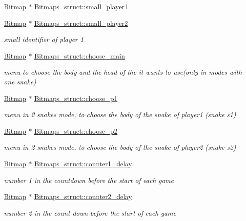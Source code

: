 \begin{DoxyCompactItemize}
\hyperlink{structBitmap}{Bitmap} $\ast$ \hyperlink{group__graphics_ga500b120fd59215d5436fe2121557d34a}{Bitmaps\+\_\+struct\+::small\+\_\+player1}
\item 
\hyperlink{structBitmap}{Bitmap} $\ast$ \hyperlink{group__graphics_ga6d0717c0730d1f4bf907299c4cb3fb97}{Bitmaps\+\_\+struct\+::small\+\_\+player2}
\begin{DoxyCompactList}\small\item\em small identifier of player 1 \end{DoxyCompactList}\item 
\hyperlink{structBitmap}{Bitmap} $\ast$ \hyperlink{group__graphics_ga0fe961b9b328a12b933b0e3d2393e9d4}{Bitmaps\+\_\+struct\+::choose\+\_\+main}
\begin{DoxyCompactList}\small\item\em menu to choose the body and the head of the it wants to use(only in modes with one snake) \end{DoxyCompactList}\item 
\hyperlink{structBitmap}{Bitmap} $\ast$ \hyperlink{group__graphics_ga1c051bf49f7de6f60eb93649684ebfb5}{Bitmaps\+\_\+struct\+::choose\+\_\+p1}
\begin{DoxyCompactList}\small\item\em menu in 2 snakes mode, to choose the body of the snake of player1 (snake s1) \end{DoxyCompactList}\item 
\hyperlink{structBitmap}{Bitmap} $\ast$ \hyperlink{group__graphics_gabe0652c58a65bf0ccd93497ab08d9cfb}{Bitmaps\+\_\+struct\+::choose\+\_\+p2}
\begin{DoxyCompactList}\small\item\em menu in 2 snakes mode, to choose the body of the snake of player2 (snake s2) \end{DoxyCompactList}\item 
\hyperlink{structBitmap}{Bitmap} $\ast$ \hyperlink{group__graphics_ga0d2f0b6ce3ed9e3fbdca9fb0e2197c8f}{Bitmaps\+\_\+struct\+::counter1\+\_\+delay}
\begin{DoxyCompactList}\small\item\em number 1 in the countdown before the start of each game \end{DoxyCompactList}\item 
\hyperlink{structBitmap}{Bitmap} $\ast$ \hyperlink{group__graphics_gabbfd3197d8f58f68356e4c404c9b41a7}{Bitmaps\+\_\+struct\+::counter2\+\_\+delay}
\begin{DoxyCompactList}\small\item\em number 2 in the count down before the start of each game \end{DoxyCompactList}\item 

\end{DoxyCompactItemize}
